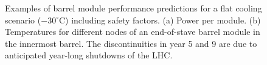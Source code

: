 \begin{figure}[ht]
\centering
{}\quad\quad
{}
\caption{Examples of barrel module performance predictions for a flat cooling scenario ($-30^\circ$C) including safety factors. (a) Power per module. (b) Temperatures for different nodes of an end-of-stave barrel module in the innermost barrel. The discontinuities in year 5 and 9 are due to anticipated year-long shutdowns of the LHC.}
\label{fig:moduleflatperformance}
\end{figure}


